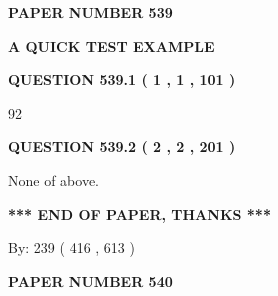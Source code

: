\documentclass[12pt]{article}
\begin{document}
   
   
   
\newpage 
\setcounter{page}{ 
   539001 } 
   
   
   
   
 {\textbf{ \Large{ PAPER NUMBER  539  }}}
   
   
\vspace{0.2in}
   
   
   
   
   
   
 \vspace{0.2in}
{\LARGE {\textbf{ A QUICK TEST EXAMPLE}}}
   
   
  
\vspace{0.2in}
  
{\textbf{\Large{QUESTION
539.1 
 ( 1 , 1 , 101 )
}}}
  
  
 
 
\noindent{}

92
 
 
  
\vspace{0.2in}
  
{\textbf{\Large{QUESTION
539.2 
 ( 2 , 2 , 201 )
}}}
  
  
 
 
\noindent{}
 
 
 None of above.
 
 
 
 
   
   
 \vspace{0.2in}
 
   
   
   
   
\vspace{1.0in} 
{\textbf{\large{ *** END OF PAPER, THANKS *** }}} 
   
   
\hspace{1.0in} By: 
 239 ( 416 ,  613 )
   
   
   
   
\newpage 
\setcounter{page}{ 
   540001 } 
   
   
   
   
 {\textbf{ \Large{ PAPER NUMBER  540  }}}
   
\end{document}

